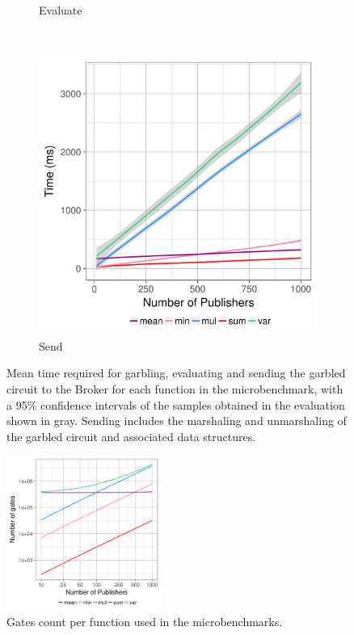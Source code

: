 \begin{figure}
\begin{subfigure}[b]{0.32\textwidth}
        \caption{Evaluate}
        \label{fig:eval-time}
    \end{subfigure}
    ~ %
    \begin{subfigure}[b]{0.32\textwidth}
        \includegraphics[width=\textwidth]{plots/send.png}
        \caption{Send}
        \label{fig:send-time}
    \end{subfigure}
    \caption{Mean time required for garbling, evaluating and sending the
    garbled circuit to the Broker for each function in the microbenchmark, with
    a 95\% confidence intervals of the samples obtained in the evaluation shown
    in gray.  Sending includes the marshaling and unmarshaling of the garbled
    circuit and associated data structures.}\label{fig:circuit-times}
\end{figure}


\begin{figure}
  \includegraphics[width=0.45\textwidth]{plots/nonxor_gates_log.png}
  \caption{Gates count per function used in the microbenchmarks.}
\end{figure}

